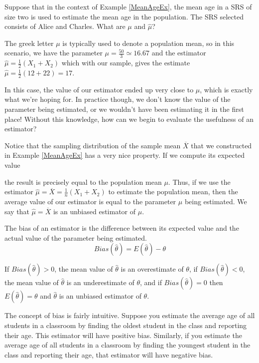 \begin{examp}Suppose that in the context of Example \ref{MeanAgeEx}, the mean age in a SRS of size two is used to estimate the mean age in the population. The SRS selected consists of Alice and Charles. What are $\mu$ and $\widehat{\mu}$?
\par
\noindent The greek letter $\mu$ is typically used to denote a population mean, so in this scenario, we have the parameter $\mu = \frac{50}{3} \simeq 16.67$ and the estimator $\widehat{\mu} = \frac{1}{2}(X_1+X_2)$ which with our sample, gives the estimate $\widehat{\mu} = \frac{1}{2}(12+22) = 17$.
\end{examp}
\par
In this case, the value of our estimator ended up very close to $\mu$, which is exactly what we're hoping for. In practice though, we don't know the value of the parameter being estimated, or we wouldn't have been estimating it in the first place! Without this knowledge, how can we begin to evaluate the usefulness of an estimator?
\par
Notice that the sampling distribution of the sample mean $\overline{X}$ that we constructed in Example \ref{MeanAgeEx} has a very nice property. If we compute its expected value 
\par
\noindent the result is precisely equal to the population mean $\mu$. Thus, if we use the estimator $\widehat\mu = \overline{X} = \frac{1}{n}(X_1+X_2)$ to estimate the population mean, then the average value of our estimator is equal to the parameter $\mu$ being estimated. We say that $\widehat\mu = \overline{X}$ is an unbiased estimator of $\mu$.

\begin{defn}\label{Unbiased Estimator} The bias of an estimator is the difference between its expected value and the actual value of the parameter being estimated.
$$\boxed{Bias(\widehat{\theta}) = E(\widehat{\theta}) - \theta}$$ 
\end{defn}
\par
If $Bias(\widehat{\theta}) > 0$, the mean value of $\widehat{\theta}$ is an overestimate of $\theta$, if $Bias(\widehat{\theta}) < 0$, the mean value of $\widehat{\theta}$ is an underestimate of $\theta$, and if $Bias(\widehat{\theta}) = 0$ then $E(\widehat{\theta}) = \theta$ and $\widehat{\theta}$ is an unbiased estimator of $\theta$.
\par
The concept of bias is fairly intuitive. Suppose you estimate the average age of all students in a classroom by finding the oldest student in the class and reporting their age. This estimator will have positive bias. Similarly, if you estimate the average age of all students in a classroom by finding the youngest student in the class and reporting their age, that estimator will have negative bias.

